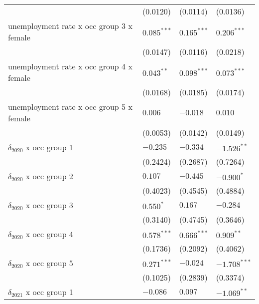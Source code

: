 \begin{tabular}{llll}
                                         &           (0.0120) &           (0.0114) &           (0.0136) \\
unemployment rate x occ group 3 x female &      $0.085^{***}$ &      $0.165^{***}$ &      $0.206^{***}$ \\
                                         &           (0.0147) &           (0.0116) &           (0.0218) \\
unemployment rate x occ group 4 x female &       $0.043^{**}$ &      $0.098^{***}$ &      $0.073^{***}$ \\
                                         &           (0.0168) &           (0.0185) &           (0.0174) \\
unemployment rate x occ group 5 x female &            $0.006$ &           $-0.018$ &            $0.010$ \\
                                         &           (0.0053) &           (0.0142) &           (0.0149) \\
$\delta_{2020}$ x occ group 1            &           $-0.235$ &           $-0.334$ &      $-1.526^{**}$ \\
                                         &           (0.2424) &           (0.2687) &           (0.7264) \\
$\delta_{2020}$ x occ group 2            &            $0.107$ &           $-0.445$ &         $-0.900^*$ \\
                                         &           (0.4023) &           (0.4545) &           (0.4884) \\
$\delta_{2020}$ x occ group 3            &          $0.550^*$ &            $0.167$ &           $-0.284$ \\
                                         &           (0.3140) &           (0.4745) &           (0.3646) \\
$\delta_{2020}$ x occ group 4            &      $0.578^{***}$ &      $0.666^{***}$ &       $0.909^{**}$ \\
                                         &           (0.1736) &           (0.2092) &           (0.4062) \\
$\delta_{2020}$ x occ group 5            &      $0.271^{***}$ &           $-0.024$ &     $-1.708^{***}$ \\
                                         &           (0.1025) &           (0.2839) &           (0.3374) \\
$\delta_{2021}$ x occ group 1            &           $-0.086$ &            $0.097$ &      $-1.069^{**}$ \\

\end{tabular}
